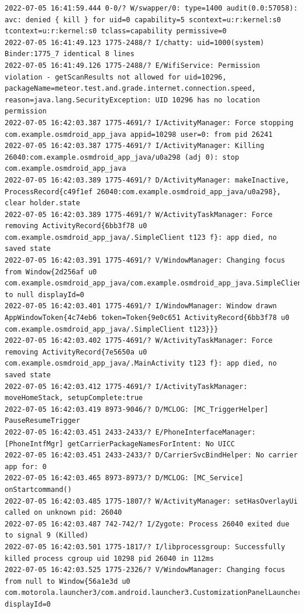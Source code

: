 \documentclass[a4paper,12pt]{book}
\begin{document}
\begin{lstlisting}
2022-07-05 16:41:59.444 0-0/? W/swapper/0: type=1400 audit(0.0:57058): avc: denied { kill } for uid=0 capability=5 scontext=u:r:kernel:s0 tcontext=u:r:kernel:s0 tclass=capability permissive=0
2022-07-05 16:41:49.123 1775-2488/? I/chatty: uid=1000(system) Binder:1775_7 identical 8 lines
2022-07-05 16:41:49.126 1775-2488/? E/WifiService: Permission violation - getScanResults not allowed for uid=10296, packageName=meteor.test.and.grade.internet.connection.speed, reason=java.lang.SecurityException: UID 10296 has no location permission
2022-07-05 16:42:03.387 1775-4691/? I/ActivityManager: Force stopping com.example.osmdroid_app_java appid=10298 user=0: from pid 26241
2022-07-05 16:42:03.387 1775-4691/? I/ActivityManager: Killing 26040:com.example.osmdroid_app_java/u0a298 (adj 0): stop com.example.osmdroid_app_java
2022-07-05 16:42:03.389 1775-4691/? D/ActivityManager: makeInactive, ProcessRecord{c49f1ef 26040:com.example.osmdroid_app_java/u0a298}, clear holder.state
2022-07-05 16:42:03.389 1775-4691/? W/ActivityTaskManager: Force removing ActivityRecord{6bb3f78 u0 com.example.osmdroid_app_java/.SimpleClient t123 f}: app died, no saved state
2022-07-05 16:42:03.391 1775-4691/? V/WindowManager: Changing focus from Window{2d256af u0 com.example.osmdroid_app_java/com.example.osmdroid_app_java.SimpleClient} to null displayId=0
2022-07-05 16:42:03.401 1775-4691/? I/WindowManager: Window drawn AppWindowToken{4c74eb6 token=Token{9e0c651 ActivityRecord{6bb3f78 u0 com.example.osmdroid_app_java/.SimpleClient t123}}}
2022-07-05 16:42:03.402 1775-4691/? W/ActivityTaskManager: Force removing ActivityRecord{7e5650a u0 com.example.osmdroid_app_java/.MainActivity t123 f}: app died, no saved state
2022-07-05 16:42:03.412 1775-4691/? I/ActivityTaskManager: moveHomeStack, setupComplete:true
2022-07-05 16:42:03.419 8973-9046/? D/MCLOG: [MC_TriggerHelper] PauseResumeTrigger
2022-07-05 16:42:03.451 2433-2433/? E/PhoneInterfaceManager: [PhoneIntfMgr] getCarrierPackageNamesForIntent: No UICC
2022-07-05 16:42:03.451 2433-2433/? D/CarrierSvcBindHelper: No carrier app for: 0
2022-07-05 16:42:03.465 8973-8973/? D/MCLOG: [MC_Service] onStartcommand()
2022-07-05 16:42:03.485 1775-1807/? W/ActivityManager: setHasOverlayUi called on unknown pid: 26040
2022-07-05 16:42:03.487 742-742/? I/Zygote: Process 26040 exited due to signal 9 (Killed)
2022-07-05 16:42:03.501 1775-1817/? I/libprocessgroup: Successfully killed process cgroup uid 10298 pid 26040 in 112ms
2022-07-05 16:42:03.525 1775-2326/? V/WindowManager: Changing focus from null to Window{56a1e3d u0 com.motorola.launcher3/com.android.launcher3.CustomizationPanelLauncher} displayId=0

\end{lstlisting}
\end{document}
